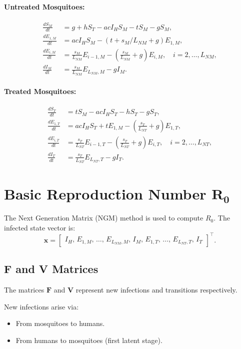 \documentclass[12pt]{article}
\begin{document}
\paragraph{Untreated Mosquitoes:}
\begin{align*}
\frac{dS_M}{dt} &= g + h S_T - a c I_H S_M - t S_M - g S_M, \\
\frac{dE_{1,M}}{dt} &= a c I_H S_M - (t + s_M/L_{NM} + g) E_{1,M}, \\
\frac{dE_{i,M}}{dt} &= \frac{s_M}{L_{NM}} E_{i-1,M} - \left(\frac{s_M}{L_{NM}} + g \right) E_{i,M}, \quad i=2,\dots,L_{NM}, \\
\frac{dI_M}{dt} &= \frac{s_M}{L_{NM}} E_{L_{NM},M} - g I_M.
\end{align*}

\paragraph{Treated Mosquitoes:}
\begin{align*}
\frac{dS_T}{dt} &= t S_M - a c I_H S_T - h S_T - g S_T, \\
\frac{dE_{1,T}}{dt} &= a c I_H S_T + t E_{1,M} - \left(\frac{s_T}{L_{NT}} + g\right) E_{1,T}, \\
\frac{dE_{i,T}}{dt} &= \frac{s_T}{L_{NT}} E_{i-1,T} - \left(\frac{s_T}{L_{NT}} + g \right) E_{i,T}, \quad i=2,\dots,L_{NT}, \\
\frac{dI_T}{dt} &= \frac{s_T}{L_{NT}} E_{L_{NT},T} - g I_T.
\end{align*}

\section{Basic Reproduction Number \(\mathbf{R_0}\)}

The Next Generation Matrix (NGM) method is used to compute \(R_0\). The infected state vector is:
\[
\mathbf{x} = \begin{bmatrix}
I_H,\, E_{1,M},\, \dots,\, E_{L_{NM},M},\, I_M,\, E_{1,T},\, \dots,\, E_{L_{NT},T},\, I_T
\end{bmatrix}^\top.
\]

\subsection{F and V Matrices}

The matrices \(\mathbf{F}\) and \(\mathbf{V}\) represent new infections and transitions respectively.

New infections arise via:
\begin{itemize}
    \item From mosquitoes to humans.
    \item From humans to mosquitoes (first latent stage).
\end{itemize}
\end{document}
